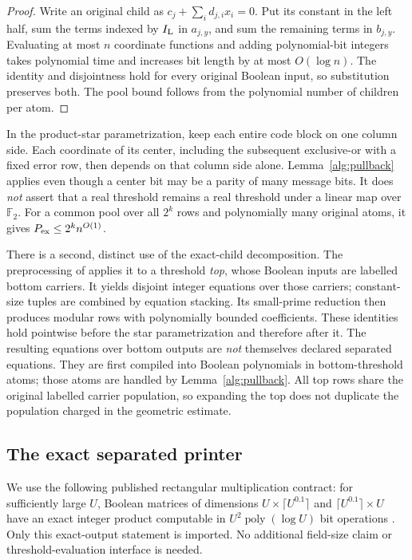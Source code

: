 \documentclass[11pt,letterpaper]{article}
\theoremstyle{definition}
\theoremstyle{remark}
\newcommand{\poly}{\operatorname{poly}}
\begin{document}
\begin{proof}
Write an original child as $c_j+\sum_i d_{j,i}x_i=0$.  Put its constant
in the left half, sum the terms indexed by $I_{\rm L}$ in $a_{j,y}$, and
sum the remaining terms in $b_{j,y}$.  Evaluating at most $n$ coordinate
functions and adding polynomial-bit integers takes polynomial time and
increases bit length by at most $O(\log n)$.  The identity and disjointness
hold for every original Boolean input, so substitution preserves both.
The pool bound follows from the polynomial number of children per atom.
\end{proof}

In the product-star parametrization, keep each entire code block on one
column side.  Each coordinate of its center, including the subsequent
exclusive-or with a fixed error row, then depends on that column side
alone.  Lemma~\ref{alg:pullback} applies even though a center bit may be a
parity of many message bits.  It does \emph{not} assert that a real
threshold remains a real threshold under a linear map over
$\mathbb F_2$.  For a common pool over all $2^k$ rows and polynomially
many original atoms, it gives $P_{\rm ex}\le 2^k n^{O(1)}$.

There is a second, distinct use of the exact-child decomposition.
The preprocessing of \cite[Appendix~A.13]{NagCubic} applies it to a
threshold \emph{top}, whose Boolean inputs are labelled bottom carriers.
It yields disjoint integer equations over those carriers; constant-size
tuples are combined by equation stacking.  Its small-prime reduction then
produces modular rows with polynomially bounded coefficients.  These
identities hold pointwise before the star parametrization and therefore
after it.  The resulting equations over bottom outputs are \emph{not}
themselves declared separated equations.  They are first compiled into
Boolean polynomials in bottom-threshold atoms; those atoms are handled by
Lemma~\ref{alg:pullback}.  All top rows share the original labelled carrier
population, so expanding the top does not duplicate the population charged
in the geometric estimate.

\subsection{The exact separated printer}

We use the following published rectangular multiplication contract:
for sufficiently large $U$, Boolean matrices of dimensions
$U\times\lceil U^{0.1}\rceil$ and
$\lceil U^{0.1}\rceil\times U$ have an exact integer product computable
in $U^2\poly(\log U)$ bit operations
\cite[Corollary~4.4 and Appendix~C, Corollary~C.2]{WilliamsRect}.
Only this exact-output statement is imported.  No additional field-size
claim or threshold-evaluation interface is needed.
\end{document}
